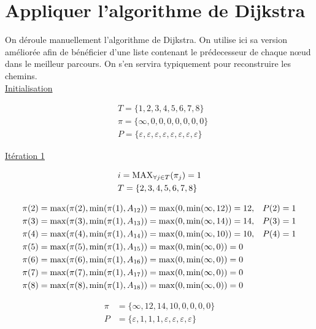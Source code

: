 \documentclass{article}
\begin{document}
\section{Appliquer l'algorithme de Dijkstra }

On déroule manuellement l'algorithme de Dijkstra. On utilise ici sa
version améliorée afin de bénéficier d'une liste contenant le
prédecesseur de chaque n\oe ud dans le meilleur parcours. On s'en
servira typiquement pour reconstruire les chemins.\\

\underline{Initialisation}

\begin{align*}
  &T = \{1,2,3,4,5,6,7,8\} \\
  &\pi = \{\infty, 0,0,0,0,0,0,0\} \\
  &P = \{\varepsilon,\varepsilon,\varepsilon,\varepsilon,\varepsilon,\varepsilon,\varepsilon,\varepsilon\}
\end{align*}

\underline{Itération 1}

\begin{align*}
  &i = \operatorname{MAX}_{\forall j \in T}(\pi_j) = 1\\
  &T = \{2,3,4,5,6,7,8\}
\end{align*}

\begin{align*}
  &\pi(2) = \operatorname{max}(\pi(2), \operatorname{min}(\pi(1), A_{12})) = \operatorname{max}(0, \operatorname{min}(\infty,12)) = 12, &P(2) = 1\\
  &\pi(3) = \operatorname{max}(\pi(3), \operatorname{min}(\pi(1), A_{13})) = \operatorname{max}(0, \operatorname{min}(\infty,14)) = 14, &P(3) = 1\\
  &\pi(4) = \operatorname{max}(\pi(4), \operatorname{min}(\pi(1), A_{14})) = \operatorname{max}(0, \operatorname{min}(\infty,10)) = 10, &P(4) = 1\\
  &\pi(5) = \operatorname{max}(\pi(5), \operatorname{min}(\pi(1), A_{15})) = \operatorname{max}(0, \operatorname{min}(\infty,0)) = 0\\
  &\pi(6) = \operatorname{max}(\pi(6), \operatorname{min}(\pi(1), A_{16})) = \operatorname{max}(0, \operatorname{min}(\infty,0)) = 0\\
  &\pi(7) = \operatorname{max}(\pi(7), \operatorname{min}(\pi(1), A_{17})) = \operatorname{max}(0, \operatorname{min}(\infty,0)) = 0\\
  &\pi(8) = \operatorname{max}(\pi(8), \operatorname{min}(\pi(1), A_{18})) = \operatorname{max}(0, \operatorname{min}(\infty,0)) = 0
\end{align*}

\begin{align*}
  \pi &= \{\infty,12,14,10,0,0,0,0\}\\
  P &= \{\varepsilon, 1, 1, 1, \varepsilon, \varepsilon, \varepsilon, \varepsilon\}
\end{align*}
\end{document}
